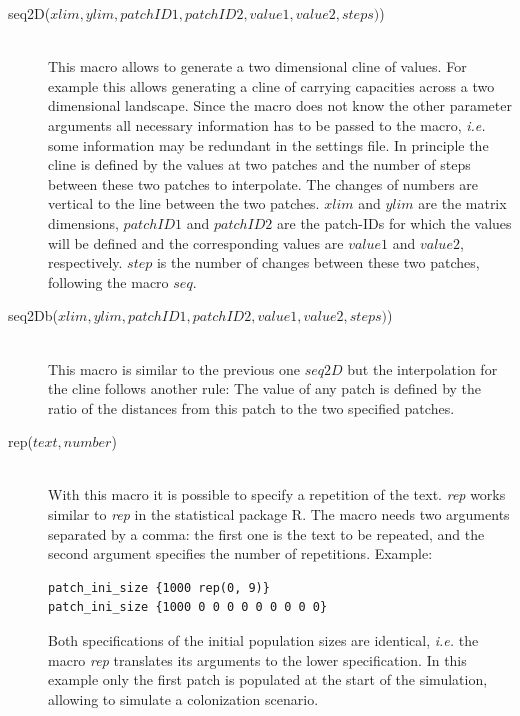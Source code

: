 \documentclass[letterpaper,12pt,oneside]{book}
\begin{document}
\begin{description}
\item[seq2D($xlim, ylim, patchID1, patchID2, value1, value2, steps)$)]\hspace*{\fill}\\
This macro allows to generate a two dimensional cline of values. For example this allows generating a cline of carrying capacities across a two dimensional landscape. Since the macro does not know the other parameter arguments all necessary information has to be passed to the macro, \textit{i.e.} some information may be redundant in the settings file. In principle the cline is defined by the values at two patches and the number of steps between these two patches to interpolate. The changes of numbers are vertical to the line between the two patches. $xlim$ and $ylim$ are the matrix dimensions, $patchID1$ and $patchID2$ are the patch-IDs for which the values will be defined and the corresponding values are $value1$ and $value2$, respectively. $step$ is the number of changes between these two patches, following the macro $seq$.

\item[seq2Db($xlim, ylim, patchID1, patchID2, value1, value2, steps)$)]\hspace*{\fill}\\
This macro is similar to the previous one $seq2D$ but the interpolation for the cline follows another rule: The value of any patch is defined by the ratio of the distances from this patch to the two specified patches.

\item[rep($text, number$)]\hspace*{\fill}\\
With this macro it is possible to specify a repetition of the text. \textit{rep} works similar to \textit{rep} in the statistical package R. The macro needs two arguments separated by a comma: the first one is the text to be repeated, and the second argument specifies the number of repetitions. Example:
\begin{lstlisting}[frame=single]
patch_ini_size {1000 rep(0, 9)}
patch_ini_size {1000 0 0 0 0 0 0 0 0 0}
\end{lstlisting}
Both specifications of the initial population sizes are identical, \textit{i.e.} the macro \textit{rep} translates its arguments to the lower specification. In this example only the first patch is populated at the start of the simulation, allowing to simulate a colonization scenario. 


\end{description}
\end{document}
